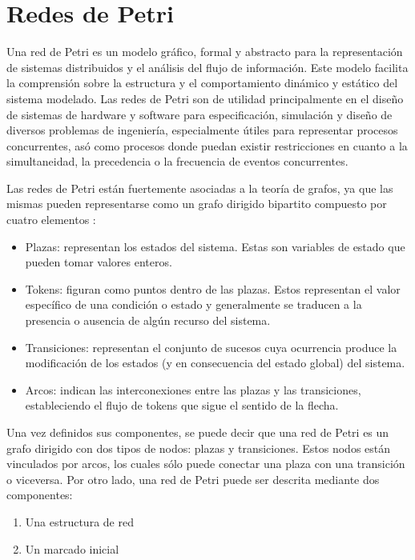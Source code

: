 \section{Redes de Petri}

Una red de Petri es un modelo gráfico, formal y abstracto para la representación de sistemas distribuidos y el análisis del flujo de información. Este modelo facilita la comprensión sobre la estructura y el comportamiento dinámico y estático del sistema modelado. Las redes de Petri son de utilidad principalmente en el diseño de sistemas de hardware y software para especificación, simulación y diseño de diversos problemas de ingeniería, especialmente útiles para representar procesos concurrentes, asó como procesos donde puedan existir restricciones en cuanto a la simultaneidad, la precedencia o la frecuencia de eventos concurrentes. \cite{brams}

Las redes de Petri están fuertemente asociadas a la teoría de grafos, ya que las mismas pueden representarse como un grafo dirigido bipartito compuesto por cuatro elementos \cite{libropopn}:

\begin{itemize}
    \item Plazas: representan los estados del sistema. Estas son variables de estado que pueden tomar valores enteros.
    \item Tokens: figuran como puntos dentro de las plazas. Estos representan el valor específico de una condición o estado y generalmente se traducen a la presencia o ausencia de algún recurso del sistema.
    \item Transiciones: representan el conjunto de sucesos cuya ocurrencia produce la modificación de los estados (y en consecuencia del estado global) del sistema.
    \item Arcos: indican las interconexiones entre las plazas y las transiciones, estableciendo el flujo de tokens que sigue el sentido de la flecha.
\end{itemize}

Una vez definidos sus componentes, se puede decir que una red de Petri es un grafo dirigido con dos tipos de nodos: plazas y transiciones. Estos nodos están vinculados por arcos, los cuales sólo puede conectar una plaza con una transición o viceversa. Por otro lado, una red de Petri puede ser descrita mediante dos componentes:

\begin{enumerate}
    \item Una estructura de red
    \item Un marcado inicial
\end{enumerate}

